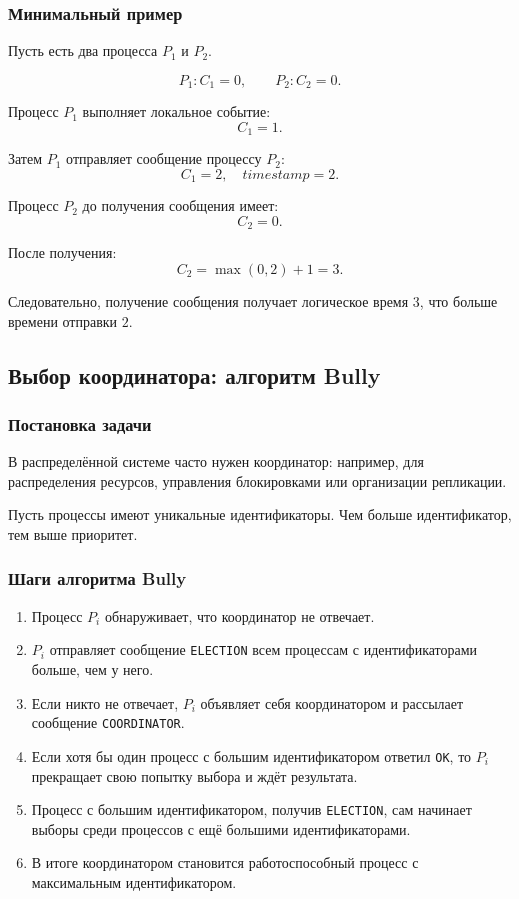 \documentclass[12pt,a4paper]{article}
\begin{document}
\subsubsection{Минимальный пример}

Пусть есть два процесса $P_1$ и $P_2$.

\[
P_1: C_1=0,\qquad P_2: C_2=0.
\]

Процесс $P_1$ выполняет локальное событие:
\[
C_1=1.
\]

Затем $P_1$ отправляет сообщение процессу $P_2$:
\[
C_1=2,\quad timestamp=2.
\]

Процесс $P_2$ до получения сообщения имеет:
\[
C_2=0.
\]

После получения:
\[
C_2=\max(0,2)+1=3.
\]

Следовательно, получение сообщения получает логическое время $3$, что больше времени отправки $2$.

\subsection{Выбор координатора: алгоритм Bully}

\subsubsection{Постановка задачи}

В распределённой системе часто нужен координатор: например, для распределения ресурсов, управления блокировками или организации репликации.

Пусть процессы имеют уникальные идентификаторы. Чем больше идентификатор, тем выше приоритет.

\subsubsection{Шаги алгоритма Bully}

\begin{enumerate}
    \item Процесс $P_i$ обнаруживает, что координатор не отвечает.
    \item $P_i$ отправляет сообщение \texttt{ELECTION} всем процессам с идентификаторами больше, чем у него.
    \item Если никто не отвечает, $P_i$ объявляет себя координатором и рассылает сообщение \texttt{COORDINATOR}.
    \item Если хотя бы один процесс с большим идентификатором ответил \texttt{OK}, то $P_i$ прекращает свою попытку выбора и ждёт результата.
    \item Процесс с большим идентификатором, получив \texttt{ELECTION}, сам начинает выборы среди процессов с ещё большими идентификаторами.
    \item В итоге координатором становится работоспособный процесс с максимальным идентификатором.
\end{enumerate}
\end{document}
